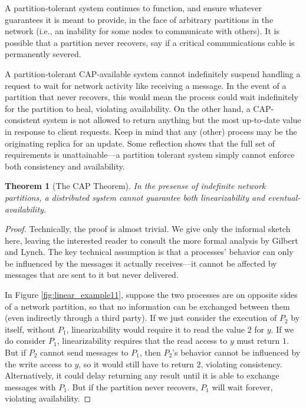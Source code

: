 \documentclass[]             %
{NASA}                       %
\newtheorem{theorem}{Theorem}[section]
\theoremstyle{definition}
\begin{document}
A partition-tolerant system continues to function, and ensure whatever
guarantees it is meant to provide, in the face of arbitrary partitions
in the network (i.e., an inability for some nodes to communicate with
others). It is possible that a partition never recovers, say if a
critical communications cable is permanently severed.

A partition-tolerant CAP-available system cannot indefinitely suspend
handling a request to wait for network activity like receiving a
message. In the event of a partition that never recovers, this would
mean the process could wait indefinitely for the partition to heal,
violating availability. On the other hand, a CAP-consistent system is
not allowed to return anything but the most up-to-date value in response
to client requests. Keep in mind that any (other) process may be the
originating replica for an update. Some reflection shows that the full
set of requirements is unattainable---a partition tolerant system simply
cannot enforce both consistency and availability.

\begin{theorem}[The CAP Theorem]
    \label{thm:cap}
    In the presense of indefinite network partitions, a distributed system
    cannot guarantee both linearizability and eventual-availability.
\end{theorem}
\begin{proof}
Technically, the proof is almost trivial. We give only the informal
sketch here, leaving the interested reader to consult the more formal
analysis by Gilbert and Lynch. The key technical assumption is that a
processes' behavior can only be influenced by the messages it actually
receives---it cannot be affected by messages that are sent to it but
never delivered.

In Figure \ref{fig:linear_example11}, suppose the two processes are on
opposite sides of a network partition, so that no information can be
exchanged between them (even indirectly through a third party). If we
just consider the execution of $P_2$ by itself, without $P_1$,
linearizability would require it to read the value $2$ for $y$. If we
do consider $P_1$, linearizability requires that the read access to
$y$ must return $1$. But if $P_2$ cannot send messages to $P_1$, then
$P_2$'s behavior cannot be influenced by the write access to $y$, so
it would still have to return $2$, violating
consistency. Alternatively, it could delay returning any result until
it is able to exchange messages with $P_1$. But if the partition never
recovers, $P_1$ will wait forever, violating availability.
\end{proof}
\end{document}
